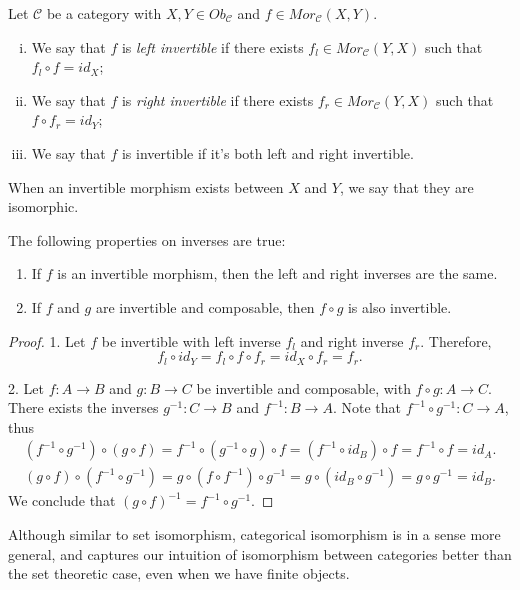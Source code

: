 \begin{definition}
	Let $\mathcal C$ be a category with $X,Y \in Ob_\mathcal C$ and $f \in Mor_\mathcal C (X,Y)$.
	\begin{enumerate}[(i)]
		\item We say that $f$ is \textit{left invertible} if there exists $f_l \in Mor_\mathcal C (Y,X)$ such
		      that $f_l \circ f = id_X$;
		\item We say that $f$ is \textit{right invertible} if there exists $f_r \in Mor_\mathcal C (Y,X)$ such
		      that $f \circ f_r = id_Y$;
		\item We say that $f$ is invertible if it's both left and right invertible.
	\end{enumerate}
	When an invertible morphism exists between $X$ and $Y$, we say that they are isomorphic.
	\label{def:CategoricalIsomorphism}
\end{definition}

\begin{proposition}
	The following properties on inverses are true:
	\begin{enumerate}[1.]
		\item If $f$ is an invertible morphism, then the left and right inverses are the same.
		\item If $f$ and $g$ are invertible and composable, then $f \circ g$ is also invertible.
	\end{enumerate}
\end{proposition}
\begin{proof}
	1. Let $f$ be invertible with left inverse $f_l$ and right inverse $f_r$. Therefore,
	\begin{displaymath}
		f_l \circ id_Y = f_l \circ f \circ f_r = id_X \circ f_r = f_r.
	\end{displaymath}

	2. Let $f:A\to B$ and $g: B \to C$ be invertible and composable, with $f\circ g: A \to C$.
	There exists the inverses $g^{-1}: C \to B$ and $f^{-1}:B \to A$. Note that
	$f^{-1}\circ g^{-1}:C \to A$, thus
	\begin{align*}
		(f^{-1} \circ g^{-1}) \circ (g \circ f) =
		f^{-1} \circ (g^{-1} \circ g) \circ f =
		(f^{-1} \circ id_B) \circ f =
		f^{-1} \circ f =
		id_A.
	\end{align*}
	\begin{align*}
		(g \circ f) \circ (f^{-1} \circ g^{-1})  =
		g \circ (f \circ f^{-1}) \circ g^{-1} =
		g \circ (id_B \circ g^{-1}) =
		g \circ g^{-1} =
		id_B.
	\end{align*}
	We conclude that $(g\circ f)^{-1} = f^{-1} \circ g^{-1}$.

\end{proof}
Although similar to set isomorphism, categorical isomorphism is in a sense more general,
and captures our intuition of isomorphism between categories better than the set theoretic case,
even when we have finite objects.


